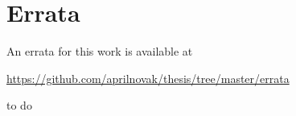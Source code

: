 \documentclass{ucbthesis}
\begin{document}
\begin{frontmatter}

\begin{comment}
\begin{dedication}
\null\vfil
\begin{center}
To my family and friends\\\vspace{12pt}
\end{center}
\vfil\null
\end{dedication}
\end{comment}


\clearpage
\begin{KeepFromToc}
\tableofcontents
\end{KeepFromToc}
\clearpage

\clearpage
\printglossary[style=mystyle]

\clearpage


\clearpage


\clearpage
\chapter*{Errata}

An errata for this work is available at

\begin{center}
\url{https://github.com/aprilnovak/thesis/tree/master/errata}
\end{center}


\begin{acknowledgements}
to do
\end{acknowledgements}

\end{frontmatter}

\pagestyle{headings}

















\clearpage

\printbibliography
\end{document}
